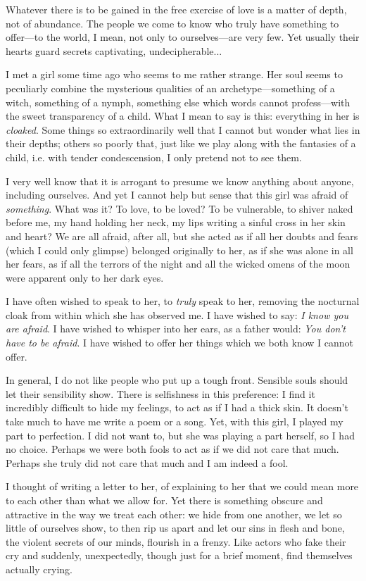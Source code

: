 \documentclass[a4paper, 12pt]{article}
\begin{document}
Whatever there is to be gained in the free exercise of love is a matter of
depth, not of abundance. The people we come to know who truly have something to
offer—to the world, I mean, not only to ourselves—are very few. Yet usually
their hearts guard secrets captivating, undecipherable... 

I met a girl some time ago who seems to me rather strange. Her soul seems to
peculiarly combine the mysterious qualities of an archetype—something of a
witch, something of a nymph, something else which words cannot profess—with the
sweet transparency of a child. What I mean to say is this: everything
in her is \textit{cloaked}. Some things so extraordinarily well that I cannot
but wonder what lies in their depths; others so poorly that, just like we play
along with the fantasies of a child, i.e. with tender condescension, I only
pretend not to see them.

I very well know that it is arrogant to presume we know anything about anyone,
including ourselves. And yet I cannot help but sense that this girl was afraid
of \textit{something}. What was it? To love, to be loved? To be vulnerable,
to shiver naked before me, my hand holding her neck, my lips writing a sinful
cross in her skin and heart? We are all afraid, after all, but she acted as
if all her doubts and fears (which I could only glimpse) belonged originally
to her, as if she was alone in all her fears, as if all the terrors of the
night and all the wicked omens of the moon were apparent only to her dark eyes.

I have often wished to speak to her, to \textit{truly} speak to her, removing
the nocturnal cloak from within which she has observed me. I have wished to
say: \textit{I know you are afraid}. I have wished to whisper into her ears, as
a father would: \textit{You don't have to be afraid}. I have wished to offer her
things which we both know I cannot offer.

In general, I do not like people who put up a tough front. Sensible souls
should let their sensibility show. There is selfishness in this preference: I
find it incredibly difficult to hide my feelings, to act as if I had a thick
skin. It doesn't take much to have me write a poem or a song. Yet, with this
girl, I played my part to perfection. I did not want to, but she was playing a
part herself, so I had no choice. Perhaps we were both fools to act as if we
did not care that much. Perhaps she truly did not care that much and I am
indeed a fool.

I thought of writing a letter to her, of explaining to her that we could mean
more to each other than what we allow for. Yet there is something obscure and
attractive in the way we treat each other: we hide from one another, we let so
little of ourselves show, to then rip us apart and let our sins in flesh and
bone, the violent secrets of our minds, flourish in a frenzy. Like actors who
fake their cry and suddenly, unexpectedly, though just for a brief moment, find
themselves actually crying. 
\end{document}
